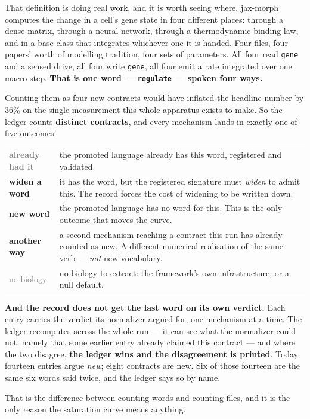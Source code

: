 \documentclass[11pt,a4paper]{article}
\newcommand{\code}[1]{\texttt{#1}}
\newcommand{\cNew}{\textcolor{good}{\textbf{new word}}}
\newcommand{\cImpl}{\textcolor{rule}{\textbf{another way}}}
\newcommand{\cAlias}{\textcolor{grey}{\textbf{already had it}}}
\newcommand{\cRef}{\textcolor{warn}{\textbf{widen a word}}}
\newcommand{\cOut}{\textcolor{grey}{no biology}}
\begin{document}
That definition is doing real work, and it is worth seeing where. jax-morph computes the change in
a cell's gene state in four different places: through a dense matrix, through a neural network,
through a thermodynamic binding law, and in a base class that integrates whichever one it is
handed. Four files, four papers' worth of modelling tradition, four sets of parameters. All four
read \code{gene} and a sensed drive, all four write \code{gene}, all four emit a rate integrated
over one macro-step. \textbf{That is one word --- \code{regulate} --- spoken four ways.}

Counting them as four new contracts would have inflated the headline number by 36\% on the single
measurement this whole apparatus exists to make. So the ledger counts \textbf{distinct contracts},
and every mechanism lands in exactly one of five outcomes:

\begin{center}
\small
\begin{tabular}{@{}l p{11.9cm}@{}}
\toprule
\cAlias & the promoted language already has this word, registered and validated.\\
\cRef & it has the word, but the registered signature must \emph{widen} to admit this. The record
forces the cost of widening to be written down.\\
\cNew & the promoted language has no word for this. This is the only outcome that moves the
curve.\\
\cImpl & a second mechanism reaching a contract this run has already counted as new. A different
numerical realisation of the same verb --- \emph{not} new vocabulary.\\
\cOut & no biology to extract: the framework's own infrastructure, or a null default.\\
\bottomrule
\end{tabular}
\end{center}

\textbf{And the record does not get the last word on its own verdict.} Each entry carries the
verdict its normalizer argued for, one mechanism at a time. The ledger recomputes across the whole
run --- it can see what the normalizer could not, namely that some earlier entry already claimed
this contract --- and where the two disagree, \textbf{the ledger wins and the disagreement is
printed}. Today fourteen entries argue \emph{new}; eight contracts are new. Six of those fourteen
are the same six words said twice, and the ledger says so by name.

That is the difference between counting words and counting files, and it is the only reason the
saturation curve means anything.
\end{document}
